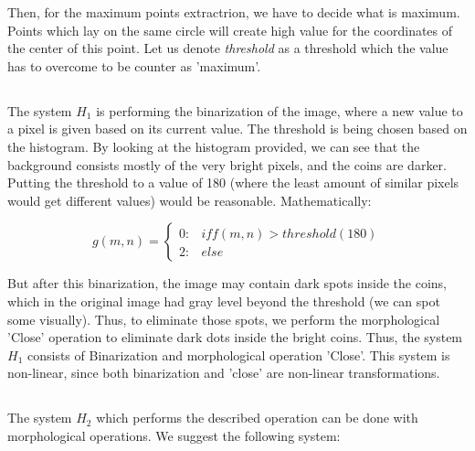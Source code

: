 \documentclass[a4paper]{iacas}
\begin{document}
Then, for the maximum points extractrion, we have to decide what is maximum. Points which lay on the same circle will create high value for the coordinates of the center of this point. Let us denote \textit{threshold} as a threshold which the value has to overcome to be counter as 'maximum'. 

\begin{algorithmic}[1]
 
\ENDFOR
\end{algorithmic}

\subsection{}
The system $H_1$ is performing the binarization of the image, where a new value to a pixel is given based on its current value. The threshold is being chosen based on the histogram. By looking at the histogram provided, we can see that the background consists mostly of the very bright pixels, and the coins are darker. Putting the threshold to a value of 180 (where the least amount of similar pixels would get different values) would be reasonable. Mathematically:

\begin{equation*}
g (m,n) = 
\begin{cases}
0 :&if f(m,n) > threshold (180) \\
2 :& else
\end{cases}
\end{equation*}

But after this binarization, the image may contain dark spots inside the coins, which in the original image had gray level beyond the threshold (we can spot some visually). Thus, to eliminate those spots, we perform the morphological 'Close' operation to eliminate dark dots inside the bright coins.
\newline
Thus, the system $H_1$ consists of Binarization and morphological operation 'Close'. This system is non-linear, since both binarization and 'close' are non-linear transformations.

\subsection{}
The system $H_2$ which performs the described operation can be done with morphological operations. We suggest the following system:
\end{document}
